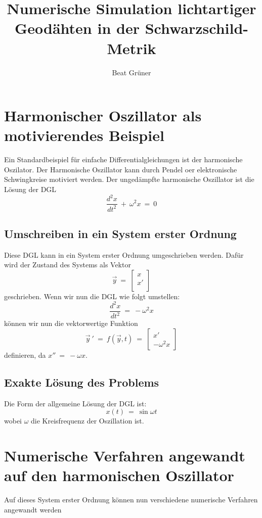 \documentclass[18px, A4]{article}
\begin{document}
\title{Numerische Simulation lichtartiger Geodähten in der Schwarzschild-Metrik}
\author{Beat Grüner}
\maketitle
\newpage
{}

\tableofcontents
\newpage



\section{Harmonischer Oszillator als motivierendes Beispiel}
Ein Standardbeispiel für einfache Differentialgleichungen ist der harmonische Oszilator.
Der Harmonische Oszillator kann durch Pendel oer elektronische Schwingkreise motiviert werden.
Der ungedämpfte harmonische Oszillator ist die Lösung der DGL
\[
    \frac{d^{2}x}{dt^{2}}\ +\ \omega^{2} x\ =\ 0
\]

\subsection{Umschreiben in ein System erster Ordnung}
Diese DGL kann in ein System erster Ordnung umgeschrieben werden. Dafür wird der
Zustand des Systems als Vektor
\[
    \vec{y}\ =\ \begin{bmatrix}
	x  \\
	x' \\
    \end{bmatrix}
\]
geschrieben. \newline
Wenn wir nun die DGL wie folgt umstellen:
\[
    \frac{d^{2}x}{dt^{2}}\ =\ -\omega^{2} x
\]
können wir nun die vektorwertige Funktion
\[
    \vec{y}\ '\ =\ f(\vec{y}, t)\ =\ \begin{bmatrix}
	x' \\
	-\omega^{2} x
    \end{bmatrix}
\]
definieren, da $x''\ =\ -\omega x$.

\subsection{Exakte Lösung des Problems}
Die Form der allgemeine Lösung der DGL ist:
\[
    x(t)\ =\ \sin \omega t
\]
wobei $\omega$ die Kreisfrequenz der Oszillation ist. 

\newpage


\section{Numerische Verfahren angewandt auf den harmonischen Oszillator}
Auf dieses System erster Ordnung können nun verschiedene numerische Verfahren angewandt werden
\end{document}
